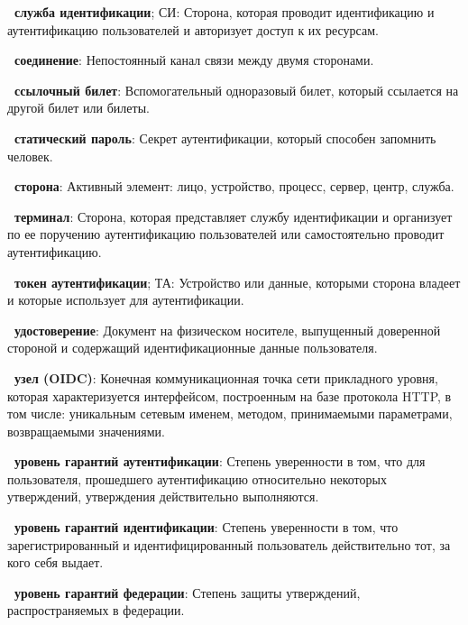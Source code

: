 {\bf \thedefctr~служба идентификации}; СИ:
Сторона, которая проводит идентификацию и аутентификацию пользователей и
авторизует доступ к их ресурсам.
	
{\bf \thedefctr~соединение}:
Непостоянный канал связи между двумя сторонами. 

{\bf \thedefctr~ссылочный билет}:
Вспомогательный одноразовый билет, который ссылается на другой билет или билеты.

{\bf \thedefctr~статический пароль}:
Секрет аутентификации, который способен запомнить человек.

{\bf \thedefctr~сторона}:
Активный элемент: лицо, устройство, процесс, сервер, центр, служба.

{\bf \thedefctr~терминал}:
Сторона, которая представляет службу идентификации и организует по ее поручению
аутентификацию пользователей или самостоятельно проводит аутентификацию.

{\bf \thedefctr~токен аутентификации}; ТА:
Устройство или данные, которыми сторона владеет и которые использует для
аутентификации.

{\bf \thedefctr~удостоверение}:
Документ на физическом носителе, выпущенный доверенной стороной и содержащий
идентификационные данные пользователя.


{\bf \thedefctr~узел (OIDC)}:
Конечная коммуникационная точка сети прикладного уровня, которая характеризуется
интерфейсом, построенным на базе протокола HTTP,  в том числе: уникальным
сетевым именем, методом, принимаемыми параметрами, возвращаемыми значениями.


{\bf \thedefctr~уровень гарантий аутентификации}:
Степень уверенности в том, что для пользователя, прошедшего аутентификацию
относительно некоторых утверждений, утверждения действительно выполняются.


{\bf \thedefctr~уровень гарантий идентификации}:
Степень уверенности в том, что зарегистрированный и идентифицированный
пользователь действительно тот, за кого себя выдает.


{\bf \thedefctr~уровень гарантий федерации}:
Степень защиты утверждений, распространяемых в федерации.

